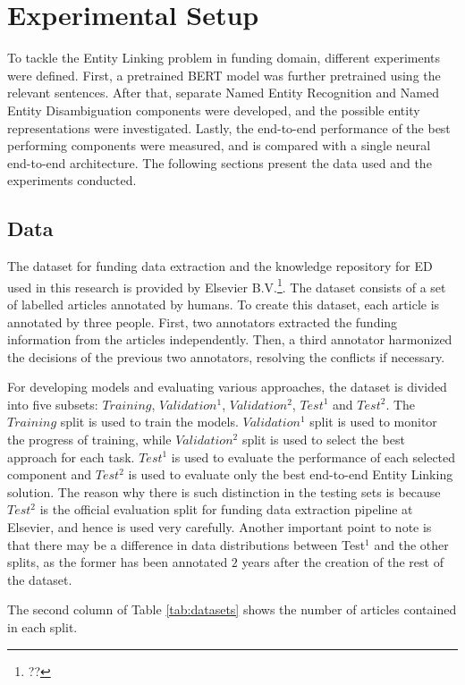 \documentclass{report}
\theoremstyle{definition}
\theoremstyle{remark}
\begin{document}
\newpage
\chapter{Experimental Setup}
To tackle the Entity Linking problem in funding domain, different experiments were defined. First, a pretrained BERT \cite{BERT} model was further pretrained using the relevant sentences. After that, separate Named Entity Recognition and Named Entity Disambiguation components were developed, and the possible entity representations were investigated. Lastly, the end-to-end performance of the best performing components were measured, and is compared with a single neural end-to-end architecture. The following sections present the data used and the experiments conducted.

\section{Data}

The dataset for funding data extraction and the knowledge repository for ED used in this research is provided by Elsevier B.V.\textcolor{red}{\footnote{??}}. The dataset consists of a set of labelled articles annotated by humans. To create this dataset, each article is annotated by three people. First, two annotators extracted the funding information from the articles independently. Then, a third annotator harmonized the decisions of the previous two annotators, resolving the conflicts if necessary. 

For developing models and evaluating various approaches, the dataset is divided into five subsets: $Training$, $Validation^{1}$, $Validation^{2}$, $Test^{1}$ and $Test^{2}$. The $Training$ split is used to train the models. $Validation^{1}$ split is used to monitor the progress of training, while $Validation^{2}$ split is used to select the best approach for each task. $Test^{1}$ is used to evaluate the performance of each selected component and $Test^{2}$ is used to evaluate only the best end-to-end Entity Linking solution. The reason why there is such distinction in the testing sets is because $Test^{2}$ is the official evaluation split for funding data extraction pipeline at Elsevier, and hence is used very carefully. Another important point to note is that there may be a difference in data distributions between Test$^{1}$ and the other splits, as the former has been annotated $2$ years after the creation of the rest of the dataset.

The second column of Table \ref{tab:datasets} shows the number of articles contained in each split. 
\end{document}
